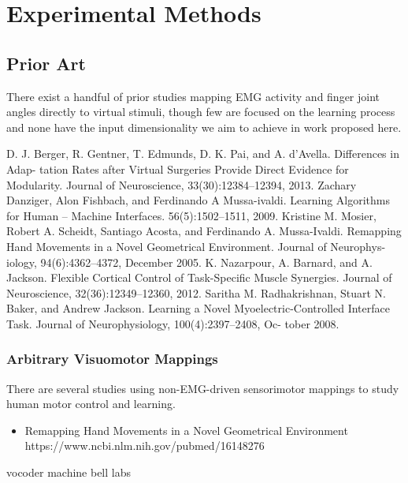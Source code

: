 \documentclass[
  a4paper,
]{article}
\providecommand{\tightlist}{%
  \setlength{\itemsep}{0pt}\setlength{\parskip}{0pt}}
\begin{document}
\hypertarget{sec:experiment}{%
\section{Experimental Methods}\label{sec:experiment}}

\hypertarget{prior-art}{%
\subsection{Prior Art}\label{prior-art}}

There exist a handful of prior studies mapping EMG activity and finger
joint angles directly to virtual stimuli, though few are focused on the
learning process and none have the input dimensionality we aim to
achieve in work proposed here.

D. J. Berger, R. Gentner, T. Edmunds, D. K. Pai, and A. d'Avella.
Differences in Adap- tation Rates after Virtual Surgeries Provide Direct
Evidence for Modularity. Journal of Neuroscience, 33(30):12384--12394,
2013. Zachary Danziger, Alon Fishbach, and Ferdinando A Mussa-ivaldi.
Learning Algorithms for Human -- Machine Interfaces. 56(5):1502--1511,
2009. Kristine M. Mosier, Robert A. Scheidt, Santiago Acosta, and
Ferdinando A. Mussa-Ivaldi. Remapping Hand Movements in a Novel
Geometrical Environment. Journal of Neurophys- iology, 94(6):4362--4372,
December 2005. K. Nazarpour, A. Barnard, and A. Jackson. Flexible
Cortical Control of Task-Specific Muscle Synergies. Journal of
Neuroscience, 32(36):12349--12360, 2012. Saritha M. Radhakrishnan,
Stuart N. Baker, and Andrew Jackson. Learning a Novel
Myoelectric-Controlled Interface Task. Journal of Neurophysiology,
100(4):2397--2408, Oc- tober 2008.

\hypertarget{arbitrary-visuomotor-mappings}{%
\subsubsection{Arbitrary Visuomotor
Mappings}\label{arbitrary-visuomotor-mappings}}

There are several studies using non-EMG-driven sensorimotor mappings to
study human motor control and learning.

\begin{itemize}
\tightlist
\item
  Remapping Hand Movements in a Novel Geometrical Environment
  https://www.ncbi.nlm.nih.gov/pubmed/16148276
\end{itemize}

vocoder machine bell labs
\end{document}
